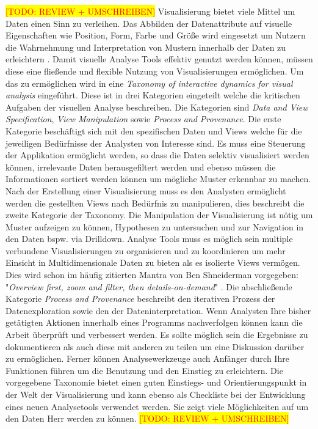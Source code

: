 \documentclass[draft=false
              ,paper=a4
              ,twoside=false
              ,fontsize=11pt
              ,headsepline
              ,BCOR10mm
              ,DIV11
              ]{scrbook}
\newcommand{\TODO}[1]{\colorbox{yellow}{\textcolor{red}{[TODO: #1]}}}
\begin{document}
\TODO{REVIEW + UMSCHREIBEN}
Visualisierung bietet viele Mittel um Daten einen Sinn zu verleihen. Das Abbilden der Datenattribute auf visuelle Eigenschaften wie Position, Form, Farbe und Größe wird eingesetzt um Nutzern die Wahrnehmung und Interpretation von Mustern innerhalb der Daten zu erleichtern \cite{shneiderman_designing_2005}. Damit visuelle Analyse Tools effektiv genutzt werden können, müssen diese eine fließende und flexible Nutzung von Visualisierungen ermöglichen. Um das zu ermöglichen wird in \cite{heer_interactive_2012} eine \textit{Taxonomy of interactive dynamics for visual analysis} eingeführt. Diese ist in drei Kategorien eingeteilt welche die kritischen Aufgaben der visuellen Analyse beschreiben. Die Kategorien sind \textit{Data and View Specification}, \textit{View Manipulation} sowie \textit{Process and Provenance}. Die erste Kategorie beschäftigt sich mit den spezifischen Daten und Views welche für die jeweiligen Bedürfnisse der Analysten von Interesse sind. Es muss eine Steuerung der Applikation ermöglicht werden, so dass die Daten selektiv visualisiert werden können, irrelevante Daten herausgefiltert werden und ebenso müssen die Informationen sortiert werden können um mögliche Muster erkennbar zu machen. Nach der Erstellung einer Visualisierung muss es den Analysten ermöglicht werden die gestellten Views nach Bedürfnis zu manipulieren, dies beschreibt die zweite Kategorie der Taxonomy. Die Manipulation der Visualisierung ist nötig um Muster aufzeigen zu können, Hypothesen zu untersuchen und zur Navigation in den Daten bspw. via Drilldown. Analyse Tools muss es möglich sein multiple verbundene Visualisierungen zu organisieren und zu koordinieren um mehr Einsicht in Multidimensionale Daten zu bieten als es isolierte Views vermögen. Dies wird schon im häufig zitierten Mantra von Ben Shneiderman vorgegeben: "\textit{Overview first, zoom and filter, then details-on-demand}" \cite{shneiderman_the_eyes_1996}. Die abschließende Kategorie \textit{Process and Provenance} beschreibt den iterativen Prozess der Datenexploration sowie den der Dateninterpretation. Wenn Analysten Ihre bisher getätigten Aktionen innerhalb eines Programms nachverfolgen können kann die Arbeit überprüft und verbessert werden. Es sollte möglich sein die Ergebnisse zu dokumentieren als auch diese mit anderen zu teilen um eine Diskussion darüber zu ermöglichen. Ferner können Analysewerkzeuge auch Anfänger durch Ihre Funktionen führen um die Benutzung und den Einstieg zu erleichtern.
Die vorgegebene Taxonomie bietet einen guten Einstiegs- und Orientierungspunkt in der Welt der Visualisierung und kann ebenso als Checkliste bei der Entwicklung eines neuen Analysetools verwendet werden. Sie zeigt viele Möglichkeiten auf um den Daten Herr werden zu können. \TODO{REVIEW + UMSCHREIBEN}
\fi
\end{document}
